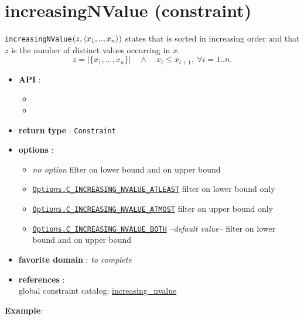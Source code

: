 \label{increasingnvalue}
\hypertarget{increasingnvalue}{}

\section{increasingNValue (constraint)}\label{increasingnvalue:increasingnvalueconstraint}\hypertarget{increasingnvalue:increasingnvalueconstraint}{}
\begin{notedef}
  \texttt{increasingNValue}$(z, \langle x_1,..,x_n\rangle)$ states that  is sorted in increasing order and that $z$ is the number of distinct values occurring in $x$.
$$z=|\{x_1,\ldots,x_n\}|\quad\land\quad x_i\le x_{i+1},\ \forall i=1..n.$$  
\end{notedef}

\begin{itemize}
	\item \textbf{API} : 
      \begin{itemize}
      \item {}
      \item {}
      \end{itemize}
	\item \textbf{return type} : \texttt{Constraint}
	\item \textbf{options} :
	\begin{itemize}
		\item \emph{no option} filter on lower bound and on upper bound
		\item \hyperlink{cinvatleast:cinvatleastoptions}{\tt Options.C\_INCREASING\_NVALUE\_ATLEAST} filter on lower bound only
		\item \hyperlink{cinvatmost:cinvatmostoptions}{\tt Options.C\_INCREASING\_NVALUE\_ATMOST} filter on upper bound only
		\item \hyperlink{cinvboth:cinvbothoptions}{\tt Options.C\_INCREASING\_NVALUE\_BOTH} \textit{--default value--} filter on lower bound and on upper bound
	\end{itemize}
	\item \textbf{favorite domain} : \emph{to complete}
	\item \textbf{references} :\\
      global constraint catalog: \href{http://www.emn.fr/x-info/sdemasse/gccat/Cincreasing_nvalue.html}{increasing\_nvalue}
\end{itemize}

\textbf{Example}:
 
